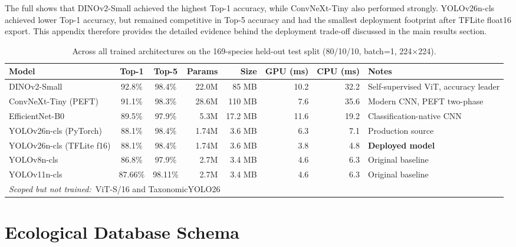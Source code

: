 \documentclass[journal,transmag]{IEEEtran}
\begin{document}
The full shows that DINOv2-Small achieved the highest Top-1 accuracy, while ConvNeXt-Tiny also performed strongly. YOLOv26n-cls achieved lower Top-1 accuracy, but remained competitive in Top-5 accuracy and had the smallest deployment footprint after TFLite float16 export. This appendix therefore provides the detailed evidence behind the deployment trade-off discussed in the main results section.


 
\begin{table}[!t]
\centering
\caption{ Across all trained architectures on the
169-species held-out test split (80/10/10, batch=1, 224$\times$224).}
\label{tab:full-leaderboard}
\small
\begin{tabular}{@{}lccrrrrl@{}}
\hline
\textbf{Model} & \textbf{Top-1} & \textbf{Top-5} & \textbf{Params}
& \textbf{Size} & \textbf{GPU (ms)} & \textbf{CPU (ms)} & \textbf{Notes} \\
\hline
DINOv2-Small               & 92.8\%          & 98.4\%          & 22.0M & 85 MB    & 10.2   & 32.2   & Self-supervised ViT, accuracy leader \\
ConvNeXt-Tiny (PEFT)       & 91.1\%          & 98.3\%          & 28.6M & 110 MB   & 7.6  & 35.6 & Modern CNN, PEFT two-phase           \\
EfficientNet-B0            & 89.5\%          & 97.9\%          & 5.3M  & 17.2 MB  & 11.6 & 19.2 & Classification-native CNN            \\
YOLOv26n-cls (PyTorch)     & 88.1\%          & 98.4\%          & 1.74M & 3.6 MB   & 6.3  & 7.1  & Production source                    \\
YOLOv26n-cls (TFLite f16)  & 88.1\%          & 98.4\%          & 1.74M & 3.6 MB   & 3.8   & 4.8  & \textbf{Deployed model}              \\
YOLOv8n-cls                & 86.8\%          & 97.9\%          & 2.7M  & 3.4 MB   & 4.6  & 6.3  & Original baseline                    \\
YOLOv11n-cls               & 87.66\%          & 98.11\%          & 2.7M  & 3.4 MB   & 4.6  & 6.3  & Original baseline                            \\
\hline
\multicolumn{8}{l}{\textit{Scoped but not trained:}~ViT-S/16 and TaxonomicYOLO26} \\
\hline
\end{tabular}
\end{table}
 
\section{\textbf{Ecological Database Schema}}
\label{app:eco-schema}
\end{document}
